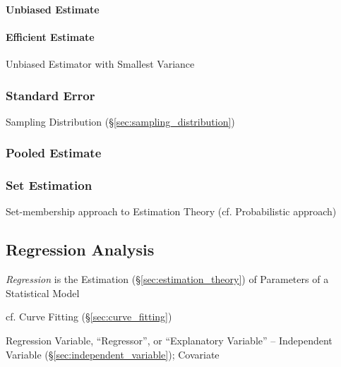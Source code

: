 \paragraph{Unbiased Estimate}\label{sec:unbiased_estimate}\hfill

\paragraph{Efficient Estimate}\label{sec:efficient_estimate}\hfill

Unbiased Estimator with Smallest Variance



\subsubsection{Standard Error}\label{sec:standard_error}

Sampling Distribution (\S\ref{sec:sampling_distribution})



\subsubsection{Pooled Estimate}\label{sec:pooled_estimate}




\subsubsection{Set Estimation}\label{sec:set_estimation}

Set-membership approach to Estimation Theory (cf. Probabilistic approach)



\subsection{Regression Analysis}\label{sec:regression_analysis}

\emph{Regression} is the Estimation (\S\ref{sec:estimation_theory}) of
Parameters of a Statistical Model

\fist cf. Curve Fitting (\S\ref{sec:curve_fitting})

Regression Variable, ``Regressor'', or ``Explanatory Variable'' -- Independent
Variable (\S\ref{sec:independent_variable}); Covariate

